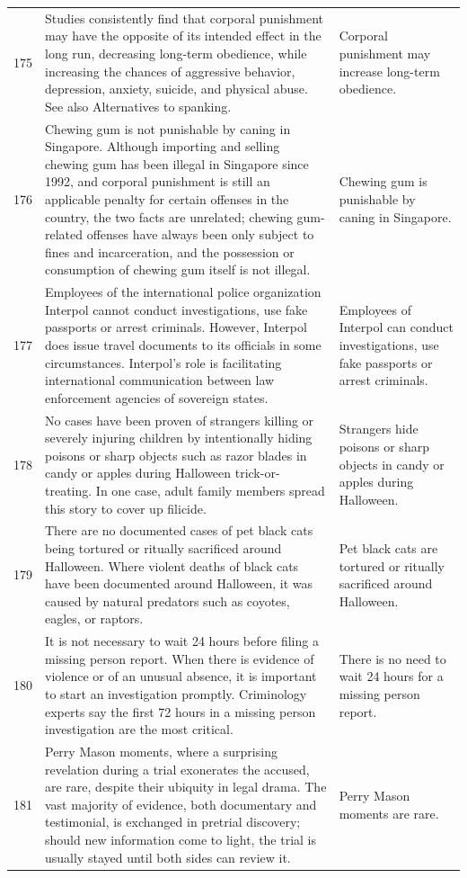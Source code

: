 \begin{tabular}{c|p{}|p{}}
175 & Studies consistently find that corporal punishment may have the opposite of its intended effect in the long run, decreasing long-term obedience, while increasing the chances of aggressive behavior, depression, anxiety, suicide, and physical abuse. See also Alternatives to spanking. & Corporal punishment may increase long-term obedience. \\
176 & Chewing gum is not punishable by caning in Singapore. Although importing and selling chewing gum has been illegal in Singapore since 1992, and corporal punishment is still an applicable penalty for certain offenses in the country, the two facts are unrelated; chewing gum-related offenses have always been only subject to fines and incarceration, and the possession or consumption of chewing gum itself is not illegal. & Chewing gum is punishable by caning in Singapore. \\
177 & Employees of the international police organization Interpol cannot conduct investigations, use fake passports or arrest criminals. However, Interpol does issue travel documents to its officials in some circumstances. Interpol's role is facilitating international communication between law enforcement agencies of sovereign states. & Employees of Interpol can conduct investigations, use fake passports or arrest criminals. \\
178 & No cases have been proven of strangers killing or severely injuring children by intentionally hiding poisons or sharp objects such as razor blades in candy or apples during Halloween trick-or-treating. In one case, adult family members spread this story to cover up filicide. & Strangers hide poisons or sharp objects in candy or apples during Halloween. \\
179 & There are no documented cases of pet black cats being tortured or ritually sacrificed around Halloween. Where violent deaths of black cats have been documented around Halloween, it was caused by natural predators such as coyotes, eagles, or raptors. & Pet black cats are tortured or ritually sacrificed around Halloween. \\
180 & It is not necessary to wait 24 hours before filing a missing person report. When there is evidence of violence or of an unusual absence, it is important to start an investigation promptly. Criminology experts say the first 72 hours in a missing person investigation are the most critical. & There is no need to wait 24 hours for a missing person report. \\
181 & Perry Mason moments, where a surprising revelation during a trial exonerates the accused, are rare, despite their ubiquity in legal drama. The vast majority of evidence, both documentary and testimonial, is exchanged in pretrial discovery; should new information come to light, the trial is usually stayed until both sides can review it. & Perry Mason moments are rare. \\

\end{tabular}
